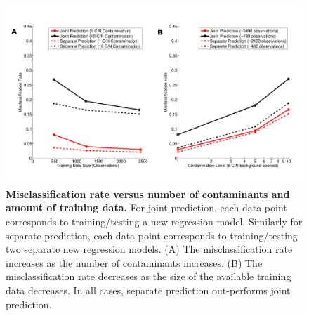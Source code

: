\documentclass[12pt]{article}
\begin{document}
\clearpage
\begin{figure}[!ht]
\centerline{\includegraphics[width=6in]{Figures/combinedContaminationTrainingdata.pdf}}
\caption{\label{fig:misclassification}\textbf{Misclassification rate versus number of contaminants and amount of training data.} For joint prediction, each data point corresponds to training/testing a new regression model. Similarly for separate prediction, each data point corresponds to training/testing two separate new regression models. (A) The misclassification rate increases as the number of contaminants increases. (B) The misclassification rate decreases as the size of the available training data decreases. In all cases, separate prediction out-performs joint prediction.}
\end{figure}
\end{document}
